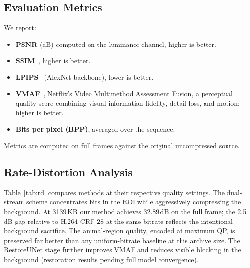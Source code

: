 \documentclass[10pt, conference]{IEEEtran}
\begin{document}
\subsection{Evaluation Metrics}

We report:
\begin{itemize}
    \item \textbf{PSNR} (dB) computed on the luminance channel, higher is better.
    \item \textbf{SSIM}~\cite{Wang_2004_SSIM}, higher is better.
    \item \textbf{LPIPS}~\cite{Zhang_2018_LPIPS} (AlexNet backbone), lower is better.
    \item \textbf{VMAF}~\cite{Li_2016_VMAF}, Netflix's Video Multimethod Assessment Fusion, a perceptual quality score combining visual information fidelity, detail loss, and motion; higher is better.
    \item \textbf{Bits per pixel (BPP)}, averaged over the sequence.
\end{itemize}
Metrics are computed on full frames against the original uncompressed source.

\subsection{Rate-Distortion Analysis}

Table~\ref{tab:rd} compares methods at their respective quality settings. The dual-stream scheme concentrates bits in the ROI while aggressively compressing the background. At 3139\,KB our method achieves 32.89\,dB on the full frame; the 2.5\,dB gap relative to H.264 CRF 28 at the same bitrate reflects the intentional background sacrifice. The animal-region quality, encoded at maximum QP, is preserved far better than any uniform-bitrate baseline at this archive size. The RestoreUNet stage further improves VMAF and reduces visible blocking in the background (restoration results pending full model convergence).
\end{document}
